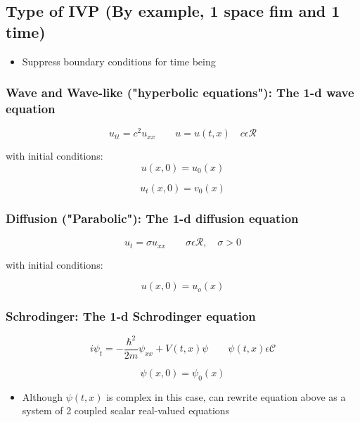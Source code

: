 \subsection{Type of IVP (By example, 1 space fim and 1 time)}

\begin{itemize}
    \item Suppress boundary conditions for time being 
\end{itemize}

\subsubsection{Wave and Wave-like ("hyperbolic equations"): The 1-d wave equation}

\begin{equation}
     u_{tt} = c^2 u_{xx} \qquad u = u(t,x) \quad c \epsilon \mathcal{R}
\end{equation}

with initial conditions:
\[ u(x,0) = u_0(x)\]

\[ u_t(x,0) = v_0(x)\]

\subsubsection{Diffusion ("Parabolic"): The 1-d diffusion equation}

\begin{equation}
    u_t = \sigma u_{xx} \qquad \sigma \epsilon \mathcal{R}, \quad \sigma > 0
\end{equation}

with initial conditions:

\[ u(x,0) = u_o(x) \]

\subsubsection{Schrodinger: The 1-d Schrodinger equation}

\begin{equation}
    i \psi_t = - \frac{\hbar^2}{2m} \psi_{xx} + V(t,x) \psi \qquad \psi(t,x) \epsilon \mathcal{C}
\end{equation}

\[ \psi(x,0) = \psi_0(x)\]

\begin{itemize}
    \item Although $\psi(t,x)$ is complex in this case, can rewrite equation above as a system of 2 coupled scalar real-valued equations
\end{itemize}

